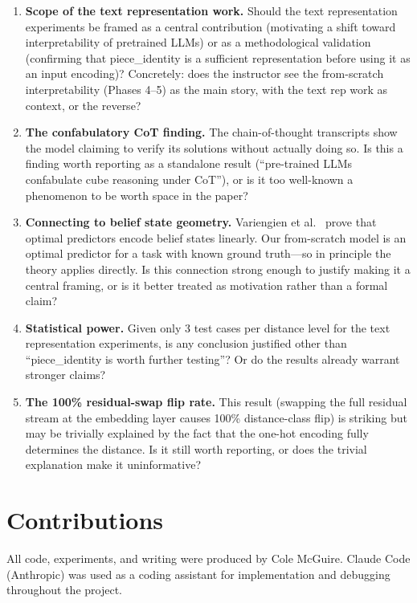 \documentclass[12pt]{article}
\begin{document}
\begin{enumerate}

  \item \textbf{Scope of the text representation work.}  Should the text
        representation experiments be framed as a central contribution (motivating
        a shift toward interpretability of pretrained LLMs) or as a methodological
        validation (confirming that piece\_identity is a sufficient representation
        before using it as an input encoding)?  Concretely: does the instructor
        see the from-scratch interpretability (Phases 4--5) as the main story, with
        the text rep work as context, or the reverse?

  \item \textbf{The confabulatory CoT finding.}  The chain-of-thought transcripts
        show the model claiming to verify its solutions without actually doing
        so.  Is this a finding worth reporting as a standalone result (``pre-trained
        LLMs confabulate cube reasoning under CoT''), or is it too well-known a
        phenomenon to be worth space in the paper?

  \item \textbf{Connecting to belief state geometry.}  Variengien et al.\
        \cite{variengien2024beliefstate} prove that optimal predictors encode
        belief states linearly.  Our from-scratch model is an optimal predictor
        for a task with known ground truth---so in principle the theory
        applies directly.  Is this connection strong enough to justify making it
        a central framing, or is it better treated as motivation rather than
        a formal claim?

  \item \textbf{Statistical power.}  Given only 3 test cases per distance level
        for the text representation experiments, is any conclusion justified other
        than ``piece\_identity is worth further testing''?  Or do the results
        already warrant stronger claims?

  \item \textbf{The 100\% residual-swap flip rate.}  This result (swapping the
        full residual stream at the embedding layer causes 100\% distance-class
        flip) is striking but may be trivially explained by the fact that the
        one-hot encoding fully determines the distance.  Is it still worth
        reporting, or does the trivial explanation make it uninformative?

\end{enumerate}

\section*{Contributions}

All code, experiments, and writing were produced by Cole McGuire.  Claude Code
(Anthropic) was used as a coding assistant for implementation and debugging
throughout the project.



\end{document}
